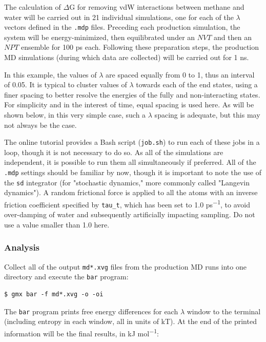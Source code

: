 \documentclass[9pt,tutorial,pubversion]{livecoms}
\begin{document}
The calculation of $\Delta$G for removing vdW interactions between methane and water will be carried out in 21 individual simulations, one for each of the $\lambda$ vectors defined in the \texttt{.mdp} files. Preceding each production simulation, the system will be energy-minimized, then equilibrated under an $NVT$ and then an $NPT$ ensemble for 100 ps each. Following these preparation steps, the production MD simulations (during which data are collected) will be carried out for 1 ns.

In this example, the values of $\lambda$ are spaced equally from 0 to 1, thus an interval of 0.05. It is typical to cluster values of $\lambda$ towards each of the end states, using a finer spacing to better resolve the energies of the fully and non-interacting states. For simplicity and in the interest of time, equal spacing is used here. As will be shown below, in this very simple case, such a $\lambda$ spacing is adequate, but this may not always be the case.

The online tutorial provides a Bash script (\texttt{job.sh}) to run each of these jobs in a loop, though it is not necessary to do so. As all of the simulations are independent, it is possible to run them all simultaneously if preferred. All of the \texttt{.mdp} settings should be familiar by now, though it is important to note the use of the \texttt{sd} integrator (for "stochastic dynamics," more commonly called "Langevin dynamics"). A random frictional force is applied to all the atoms with an inverse friction coefficient specified by \texttt{tau\_t}, which has been set to 1.0 ps\textsuperscript{$-$1}, to avoid over-damping of water and subsequently artificially impacting sampling. Do not use a value smaller than 1.0 here.

\subsubsection{Analysis} \label{vdw_ana}

Collect all of the output \texttt{md*.xvg} files from the production MD runs into one directory and execute the \texttt{bar} program:

\begin{lstlisting}
$ gmx bar -f md*.xvg -o -oi
\end{lstlisting}
%
The \texttt{bar} program prints free energy differences for each $\lambda$ window to the terminal (including entropy in each window, all in units of kT). At the end of the printed information will be the final results, in kJ mol\textsuperscript{$-$1}:
\end{document}
